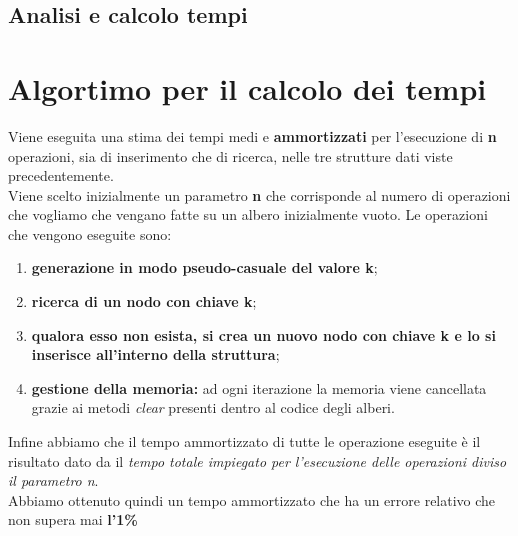 \documentclass[a4paper]{article}
\begin{document}
			\newpage
			\subsection{Analisi e calcolo tempi}
			\newpage
		\section{Algortimo per il calcolo dei tempi}
		Viene eseguita una stima dei tempi medi e \textbf{ammortizzati} per l'esecuzione di \textbf{n} operazioni, sia di inserimento che di ricerca, nelle tre strutture dati viste precedentemente. \\
		Viene scelto inizialmente un parametro \textbf{n} che corrisponde al numero di operazioni che vogliamo che vengano fatte su un albero inizialmente vuoto. Le operazioni che vengono eseguite sono:
		\begin{enumerate}
			\item \textbf{generazione in modo pseudo-casuale del valore k};
			\item \textbf{ricerca di un nodo con chiave k};
			\item \textbf{qualora esso non esista, si crea un nuovo nodo con chiave k e lo si inserisce all'interno della struttura};
			\item \textbf{gestione della memoria:} ad ogni iterazione la memoria viene cancellata grazie ai metodi \textit{clear} presenti dentro al codice degli alberi.
		\end{enumerate}
		Infine abbiamo che il tempo ammortizzato di tutte le operazione eseguite è il risultato dato da il \textit{tempo totale impiegato per l'esecuzione delle operazioni diviso il parametro n}.\\
		Abbiamo ottenuto quindi un tempo ammortizzato che ha un errore relativo che non supera mai 
		\textbf{l'1\%}
	
\end{document}
